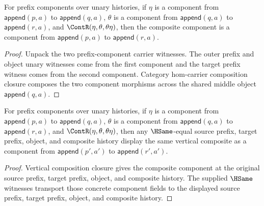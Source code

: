 \begin{theorem}
\label{thm:nattrans-prefix-component-carrier-vert-comp-closed}
For prefix components over unary histories, if \(\eta\) is a component from
\(\mathsf{append}(p,a)\) to \(\mathsf{append}(q,a)\), \(\theta\) is a component
from \(\mathsf{append}(q,a)\) to \(\mathsf{append}(r,a)\), and
\(\ContR(\eta,\theta,\theta\eta)\), then the composite component is a component
from \(\mathsf{append}(p,a)\) to \(\mathsf{append}(r,a)\).
\end{theorem}
\begin{proof}
Unpack the two prefix-component carrier witnesses. The outer prefix and object
unary witnesses come from the first component and the target prefix witness
comes from the second component. Category hom-carrier composition closure
composes the two component morphisms across the shared middle object
\(\mathsf{append}(q,a)\).
\end{proof}

\begin{theorem}
\label{thm:nattrans-prefix-component-carrier-vert-comp-hsame-transport}
For prefix components over unary histories, if $\eta$ is a component from
$\mathsf{append}(p,a)$ to $\mathsf{append}(q,a)$, $\theta$ is a component from
$\mathsf{append}(q,a)$ to $\mathsf{append}(r,a)$, and
$\ContR(\eta,\theta,\theta\eta)$, then any $\HSame$-equal source prefix,
target prefix, object, and composite history display the same vertical
composite as a component from $\mathsf{append}(p',a')$ to
$\mathsf{append}(r',a')$.
\end{theorem}
\begin{proof}
Vertical composition closure gives the composite component at the original
source prefix, target prefix, object, and composite history. The supplied
$\HSame$ witnesses transport those concrete component fields to the displayed
source prefix, target prefix, object, and composite history.
\end{proof}

